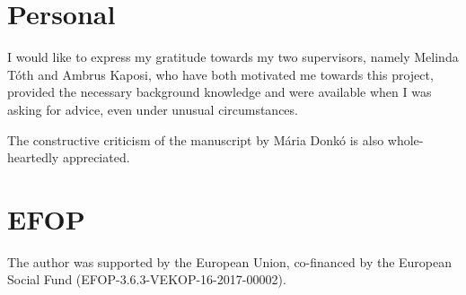 \documentclass[runningheads,a4paper]{report}
\theoremstyle{definition}
\begin{document}
\section{Personal}
{\Large
    I would like to express my gratitude towards my two supervisors, namely Melinda Tóth and Ambrus Kaposi, who have both motivated me towards this project, provided the necessary background knowledge and were available when I was asking for advice, even under unusual circumstances.

    The constructive criticism of the manuscript by Mária Donkó is also whole-heartedly appreciated.
}

\section{EFOP}
{\Large
    The author was supported by the European Union, co-financed by the European Social Fund (EFOP-3.6.3-VEKOP-16-2017-00002).
}

\newpage
{}


  
% 


{}




\end{document}
